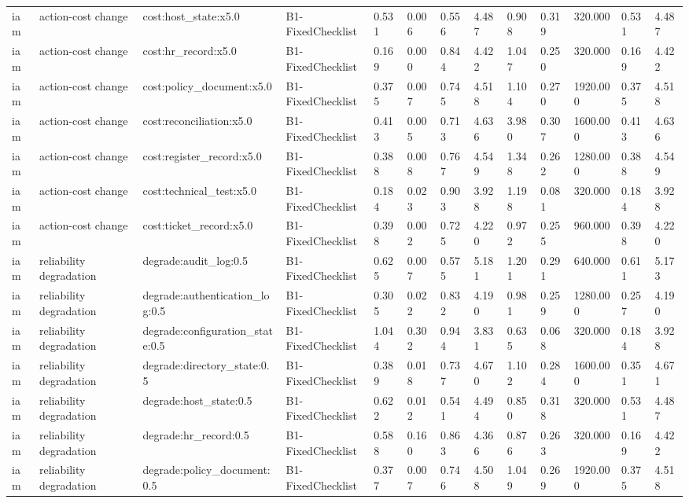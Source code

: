 \begin{table}[!ht]
{\begin{tabular}{lllllllllllll}
iam & action-cost change & cost:host\_state:x5.0 & B1-FixedChecklist & 0.531 & 0.006 & 0.556 & 4.487 & 0.908 & 0.319 & 320.000 & 0.531 & 4.487 \\
iam & action-cost change & cost:hr\_record:x5.0 & B1-FixedChecklist & 0.169 & 0.000 & 0.844 & 4.422 & 1.047 & 0.250 & 320.000 & 0.169 & 4.422 \\
iam & action-cost change & cost:policy\_document:x5.0 & B1-FixedChecklist & 0.375 & 0.007 & 0.745 & 4.518 & 1.104 & 0.270 & 1920.000 & 0.375 & 4.518 \\
iam & action-cost change & cost:reconciliation:x5.0 & B1-FixedChecklist & 0.413 & 0.005 & 0.713 & 4.636 & 3.980 & 0.307 & 1600.000 & 0.413 & 4.636 \\
iam & action-cost change & cost:register\_record:x5.0 & B1-FixedChecklist & 0.388 & 0.008 & 0.767 & 4.549 & 1.348 & 0.262 & 1280.000 & 0.388 & 4.549 \\
iam & action-cost change & cost:technical\_test:x5.0 & B1-FixedChecklist & 0.184 & 0.023 & 0.903 & 3.928 & 1.198 & 0.081 & 320.000 & 0.184 & 3.928 \\
iam & action-cost change & cost:ticket\_record:x5.0 & B1-FixedChecklist & 0.398 & 0.002 & 0.725 & 4.220 & 0.972 & 0.255 & 960.000 & 0.398 & 4.220 \\
iam & reliability degradation & degrade:audit\_log:0.5 & B1-FixedChecklist & 0.625 & 0.007 & 0.575 & 5.181 & 1.201 & 0.291 & 640.000 & 0.611 & 5.173 \\
iam & reliability degradation & degrade:authentication\_log:0.5 & B1-FixedChecklist & 0.305 & 0.022 & 0.832 & 4.190 & 0.981 & 0.259 & 1280.000 & 0.257 & 4.190 \\
iam & reliability degradation & degrade:configuration\_state:0.5 & B1-FixedChecklist & 1.044 & 0.302 & 0.944 & 3.831 & 0.635 & 0.068 & 320.000 & 0.184 & 3.928 \\
iam & reliability degradation & degrade:directory\_state:0.5 & B1-FixedChecklist & 0.389 & 0.018 & 0.737 & 4.670 & 1.102 & 0.284 & 1600.000 & 0.351 & 4.671 \\
iam & reliability degradation & degrade:host\_state:0.5 & B1-FixedChecklist & 0.622 & 0.012 & 0.541 & 4.494 & 0.850 & 0.318 & 320.000 & 0.531 & 4.487 \\
iam & reliability degradation & degrade:hr\_record:0.5 & B1-FixedChecklist & 0.588 & 0.160 & 0.863 & 4.366 & 0.876 & 0.263 & 320.000 & 0.169 & 4.422 \\
iam & reliability degradation & degrade:policy\_document:0.5 & B1-FixedChecklist & 0.377 & 0.007 & 0.746 & 4.508 & 1.049 & 0.269 & 1920.000 & 0.375 & 4.518 \\

\end{tabular}}
\end{table}
